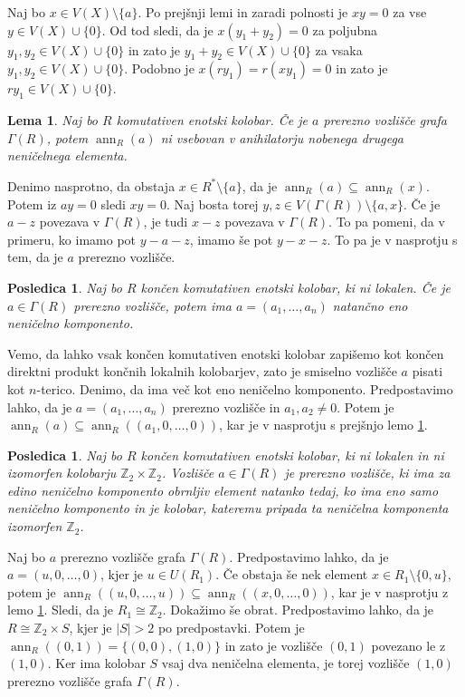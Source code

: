 \documentclass[a4paper, 12pt]{amsart}
\theoremstyle{definition} %
\theoremstyle{plain} %
\newtheorem{lema}[definicija]{Lema}
\newtheorem{posledica}[definicija]{Posledica}
\newcommand{\Z}{\mathbb Z}
\DeclareMathOperator{\ann}{ann}
\begin{document}
\proof
Naj bo $x\in V(X)\setminus\{a\}$. Po prejšnji lemi in zaradi polnosti je $xy=0$ za vse $y\in V(X)\cup\{0\}$. Od tod sledi, da je $x(y_1 + y_2) = 0$ za poljubna $y_1,y_2 \in V(X)\cup \{0\}$ in zato je $y_1 + y_2 \in V(X) \cup\{0\}$ za vsaka $y_1,y_2\in V(X)\cup\{0\}$. Podobno je $x(ry_1) = r(xy_1 ) =0$ in zato je $ry_1\in V(X) \cup\{0\}$.
\endproof

\begin{lema}
\label{cutVertexMaxAnn}
Naj bo $R$ komutativen enotski kolobar. Če je $a$ prerezno vozlišče grafa $\Gamma(R)$, potem $\ann_R(a)$ ni vsebovan v anihilatorju nobenega drugega neničelnega elementa.
\end{lema}

\proof
Denimo nasprotno, da obstaja $x\in R^*\setminus\{a\}$, da je $\ann_R(a) \subseteq \ann_R(x)$. Potem iz $ay = 0$ sledi $xy = 0$. Naj bosta torej $y,z \in V(\Gamma(R)) \setminus \{a,x\}$. Če je $a-z$ povezava v $\Gamma(R)$, je tudi $x-z$ povezava v $\Gamma(R)$. To pa pomeni, da v primeru, ko imamo pot $y-a-z$, imamo še pot $y-x-z$. To pa je v nasprotju s tem, da je $a$ prerezno vozlišče.
\endproof

\begin{posledica}
Naj bo $R$ končen komutativen enotski kolobar, ki ni lokalen. Če je $a\in \Gamma(R)$ prerezno vozlišče, potem ima $a= (a_1,\dots,a_n)$ natančno eno neničelno komponento.
\end{posledica}

\proof
Vemo, da lahko vsak končen komutativen enotski kolobar zapišemo kot končen direktni produkt končnih lokalnih kolobarjev, zato je smiselno vozlišče $a$ pisati kot $n$-terico. Denimo, da ima več kot eno neničelno komponento. Predpostavimo lahko, da je $a=(a_1,\dots,a_n)$ prerezno vozlišče in $a_1,a_2 \neq 0$. Potem je $\ann_R(a) \subseteq \ann_R((a_1,0,\dots,0))$, kar je v nasprotju s prejšnjo lemo \ref{cutVertexMaxAnn}.
\endproof

\begin{posledica}
Naj bo $R$ končen komutativen enotski kolobar, ki ni lokalen in ni izomorfen kolobarju $\Z_2 \times \Z_2$. Vozlišče $a\in \Gamma(R)$ je prerezno vozlišče, ki ima za edino neničelno komponento obrnljiv element natanko tedaj, ko ima eno samo neničelno komponento in je kolobar, kateremu pripada ta neničelna komponenta izomorfen $\Z_2$.
\end{posledica}

\proof
Naj bo $a$ prerezno vozlišče grafa $\Gamma(R)$. Predpostavimo lahko, da je $a=(u,0,\dots,0)$, kjer je $u\in U(R_1)$. Če obstaja še nek element $x\in R_1 \setminus\{0,u\}$, potem je $\ann_R((u,0,\dots,u)) \subseteq \ann_R((x,0,\dots,0))$, kar je v nasprotju z lemo \ref{cutVertexMaxAnn}. Sledi, da je $R_1\cong \Z_2$.
Dokažimo še obrat. Predpostavimo lahko, da je $R\cong \Z_2 \times S$, kjer je $|S|>2$ po predpostavki. Potem je $\ann_R((0,1)) = \{(0,0),(1,0)\}$ in zato je vozlišče $(0,1)$ povezano le z $(1,0)$. Ker ima kolobar $S$ vsaj dva neničelna elementa, je torej vozlišče $(1,0)$ prerezno vozlišče grafa $\Gamma(R)$. 
\endproof
\end{document}
